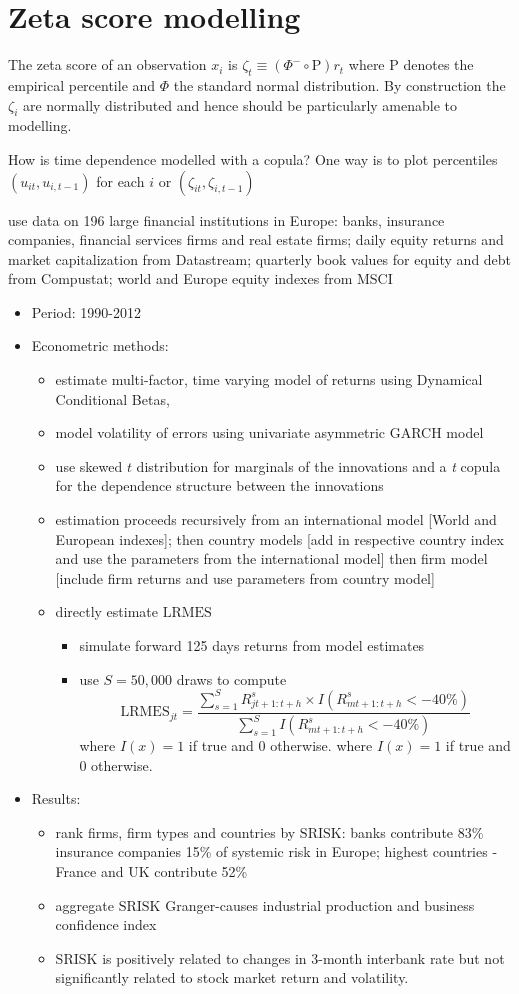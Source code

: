 \documentclass[authoryear]{elsarticle}
\newcommand{\bi}{\begin{itemize}}
\newcommand{\ei}{\end{itemize}}
\renewcommand{\i}{\item}
\newcommand{\sr}{\ensuremath{\mathrm{SRISK}}}
\newcommand{\cs}{\ensuremath{\mathrm{CS}}}
\newcommand{\lmes}{\ensuremath{\mathrm{LRMES}}}
\renewcommand{\P}{\mathrm{P}}
\begin{document}
\renewcommand{\cs}{\ensuremath{\mathrm{CS}}}

\section{Zeta score modelling}

The zeta score of an observation $x_i$ is $\zeta_t\equiv (\Phi^-\circ  \P)r_t$ where $\P$ denotes the empirical percentile and $\Phi$ the standard normal distribution.   By construction the $\zeta_i$ are normally distributed and hence should be particularly amenable to modelling.

  How is time dependence modelled   with a copula?  One way is to plot percentiles $(u_{it},u_{i,t-1})$ for each $i$ or $(\zeta_{it},\zeta_{i,t-1})$

\cite {Engle2014} use data  on  196 large financial institutions in Europe: banks, insurance companies, financial services firms and real estate firms; daily equity returns and market capitalization from Datastream; quarterly book values for equity and debt from Compustat; world and Europe equity indexes from MSCI
\bi
\i Period: 1990-2012 
\i Econometric methods:  
\bi
\i estimate multi-factor, time varying model of returns using Dynamical Conditional Betas,
\cite{Engle2014dcb}
\i model volatility of errors using univariate asymmetric GARCH model
\i use skewed $t$ distribution for marginals of the innovations and a \textit{t} copula for the dependence structure between the innovations
\i estimation proceeds recursively from an international model [World and European indexes]; then country models [add in respective country index and use the parameters from the international model] then firm model [include firm returns and use parameters from country model]  
\i directly estimate $\lmes$
\bi
\i simulate forward 125 days returns from model estimates
\i use $S=50,000$ draws to compute
$$\lmes_{jt}=\frac{\sum_{s=1}^{S}R_{jt+1:t+h}^{s} \times I(R_{mt+1:t+h}^{s} < -40\%)}{\sum_{s=1}^{S}I(R_{mt+1:t+h}^{s}<-40\%)}$$
where $I(x)=1$ if true and 0 otherwise.
where $I(x)=1$ if true and 0 otherwise.
\ei 
\ei 

\i Results:
\bi
\i rank firms, firm types and countries by $\sr$: banks contribute 83\% insurance companies 15\% of systemic risk in Europe; highest countries - France and UK contribute 52\%
\i aggregate $\sr$ Granger-causes industrial production and business confidence index
\i $\sr$ is positively related to changes in 3-month interbank rate but not significantly related to stock market return and volatility.
\ei
\ei
\end{document}
